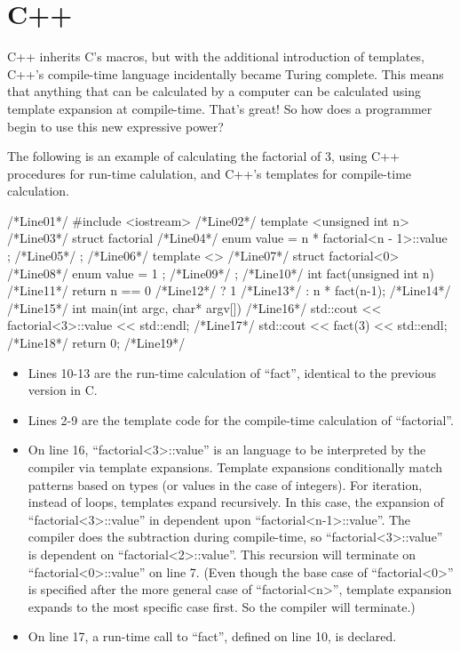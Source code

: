  \section{C++}

 C++ inherits C's macros, but with the additional introduction
 of templates, C++'s compile-time language
 incidentally became Turing complete.  This means that
 anything that can be
 calculated by a computer can be calculated using template expansion
 at compile-time.  That's great!  So how does a programmer begin to use this new
 expressive power?

 The following is an example of calculating the factorial of
 3, using C++ procedures for run-time calulation, and C++'s templates for compile-time
 calculation.

 \begin{examplecode}
 /*Line01*/  #include <iostream>
 /*Line02*/  template <unsigned int n>
 /*Line03*/  struct factorial {
 /*Line04*/      enum { value = n * factorial<n - 1>::value };
 /*Line05*/  };
 /*Line06*/  template <>
 /*Line07*/  struct factorial<0> {
 /*Line08*/      enum { value = 1 };
 /*Line09*/  };
 /*Line10*/  int fact(unsigned int n){
 /*Line11*/    return n == 0
 /*Line12*/      ? 1
 /*Line13*/      : n * fact(n-1);
 /*Line14*/  }
 /*Line15*/  int main(int argc, char* argv[]){
 /*Line16*/    std::cout << factorial<3>::value << std::endl;
 /*Line17*/    std::cout << fact(3) << std::endl;
 /*Line18*/    return 0;
 /*Line19*/  }
 \end{examplecode}

 \begin{itemize}
  \item
    Lines 10-13 are the run-time calculation of ``fact'', identical
    to the previous version in C.
  \item
   Lines 2-9 are the
   template code for the compile-time calculation of ``factorial''.
   \item
 On line 16, ``factorial\textless3\textgreater::value'' is an
 language to be interpreted
 by the compiler via template expansions.  Template expansions
 conditionally match patterns based on types (or values in the case
 of integers).  For iteration, instead of loops, templates expand recursively.
 In this case, the expansion of
 ``factorial\textless3\textgreater::value'' in dependent upon
 ``factorial\textless n-1\textgreater::value''.  The compiler
 does the subtraction during compile-time,
 so ``factorial\textless3\textgreater::value'' is dependent on
 ``factorial\textless2\textgreater::value''.
 This recursion will terminate on ``factorial\textless0\textgreater::value''
 on line 7. (Even though
 the base case of ``factorial\textless0\textgreater'' is specified
 after the more general
 case of ``factorial\textless n\textgreater'', template expansion expands to the most
 specific case first.  So the compiler will terminate.)

   \item
 On line 17, a run-time call to ``fact'', defined on line 10, is declared.
 \end{itemize}

